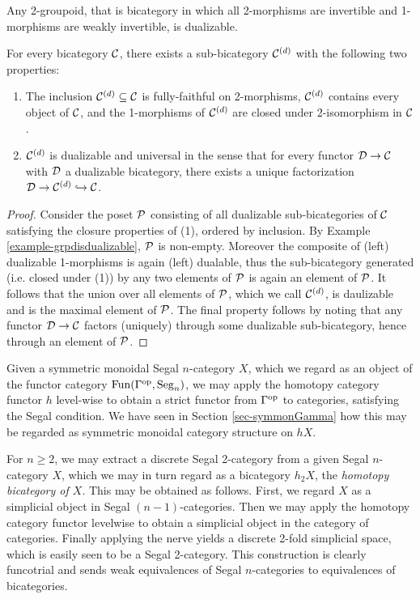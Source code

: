 \documentclass{amsart}
\begin{document}
\begin{example} \label{example-grpdisdualizable}
	Any 2-groupoid, that is bicategory in which all 2-morphisms are invertible and 1-morphisms are weakly invertible, is dualizable. 
\end{example}

\begin{lemma}
	For every bicategory $\mathcal C$, there exists a sub-bicategory $\mathcal C^{(d)}$ with the following two properties:
	\begin{enumerate}
		\item The inclusion $\mathcal C^{(d)} \subseteq \mathcal C$ is fully-faithful on 2-morphisms, $\mathcal C^{(d)}$ contains every object of $\mathcal C$, and the 1-morphisms of $\mathcal C^{(d)}$ are closed under 2-isomorphism in $\mathcal C$. 
		\item $\mathcal C^{(d)}$ is dualizable and universal in the sense that for every functor $\mathcal D \to \mathcal C$ with $\mathcal D$ a dualizable bicategory,  there exists a unique factorization $\mathcal D \to \mathcal C^{(d)} \hookrightarrow \mathcal C$.
	\end{enumerate}
\end{lemma}

\begin{proof}
	Consider the poset $\mathcal P$ consisting of all dualizable sub-bicategories of $\mathcal C$ satisfying the closure properties of (1), ordered by inclusion. By Example \ref{example-grpdisdualizable},  $\mathcal P$ is non-empty. Moreover the composite of (left) dualizable 1-morphisms is again (left) dualable, thus the sub-bicategory generated (i.e. closed under (1)) by any two elements of $\mathcal P$ is again an element of $\mathcal P$. It follows that the union over all elements of $\mathcal P$, which we call $\mathcal C^{(d)}$, is daulizable and is the maximal element of $\mathcal P$. The final property follows by noting that any functor $\mathcal D \to \mathcal C$ factors (uniquely) through some dualizable sub-bicategory, hence through an element of $\mathcal P$.
\end{proof}


Given a symmetric monoidal Segal $n$-category $X$, which we regard as an object of the functor category $\operatorname{Fun}(\Gamma^{\mathrm{op}}, \mathrm{Seg}_n)$,  we may apply the homotopy category functor $\mathit{h}$ level-wise to obtain a strict functor from $\Gamma^{\mathrm{op}}$ to categories, satisfying the Segal condition. We have seen in Section \ref{sec-symmonGamma} how this may be regarded as symmetric monoidal category structure on $\mathit{h}X$.  

For $n\geq 2$, we may extract a discrete Segal 2-category from a given Segal $n$-category $X$, which we may in turn regard as a bicategory $\mathit{h}_2X$, the {\em homotopy bicategory of $X$}. This may be obtained as follows. First, we regard $X$ as a simplicial object in Segal $(n-1)$-categories. Then we may apply the homotopy category functor levelwise to obtain a simplicial object in the category of categories. Finally applying the nerve yields a discrete 2-fold simplicial space, which is easily seen to be a Segal 2-category. This construction is clearly funcotrial and sends weak equivalences of Segal $n$-categories to equivalences of bicategories.
\end{document}
